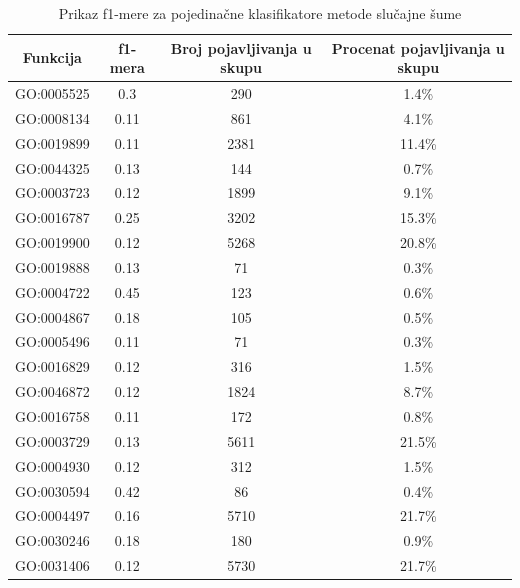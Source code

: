 \begin{table}[h]
	\centering
	\begin{tabular}{|c|c|c|c|}
		\hline
		Funkcija & f1-mera & Broj pojavljivanja u skupu & Procenat pojavljivanja u skupu \\		\hline
		GO:0005525 & 0.3 & 290 & 1.4\% \\
		\hline
		GO:0008134 & 0.11 & 861 & 4.1\% \\
		\hline
		GO:0019899 & 0.11 & 2381 & 11.4\% \\
		\hline
		GO:0044325 & 0.13 & 144 & 0.7\% \\
		\hline
		GO:0003723 & 0.12 & 1899 & 9.1\% \\
		\hline
		GO:0016787 & 0.25 & 3202 & 15.3\% \\
		\hline
		GO:0019900 & 0.12 & 5268 & 20.8\% \\
		\hline
		GO:0019888 & 0.13 & 71 & 0.3\% \\
		\hline
		GO:0004722 & 0.45 & 123 & 0.6\% \\
		\hline
		GO:0004867 & 0.18 & 105 & 0.5\% \\
		\hline
		GO:0005496 & 0.11 & 71 & 0.3\% \\
		\hline
		GO:0016829 & 0.12 & 316 & 1.5\% \\
		\hline
		GO:0046872 & 0.12 & 1824 & 8.7\% \\
		\hline
		GO:0016758 & 0.11 & 172 & 0.8\% \\
		\hline
		GO:0003729 & 0.13 & 5611 & 21.5\% \\
		\hline
		GO:0004930 & 0.12 & 312 & 1.5\% \\
		\hline
		GO:0030594 & 0.42 & 86 & 0.4\% \\
		\hline
		GO:0004497 & 0.16 & 5710 & 21.7\% \\
		\hline
		GO:0030246 & 0.18 & 180 & 0.9\% \\
		\hline
		GO:0031406 & 0.12 & 5730 & 21.7\% \\
		\hline
	\end{tabular}
	\caption{Prikaz f1-mere za pojedina\v cne klasifikatore metode slučajne šume}
	\label{tab: rfF1}
\end{table}

